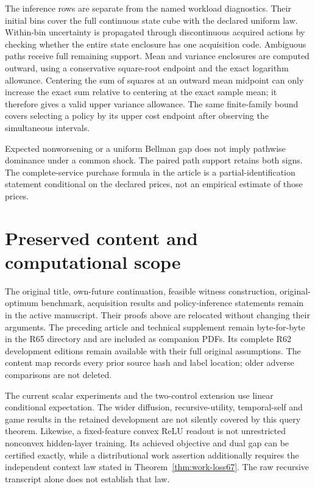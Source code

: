 The inference rows are separate from the named workload diagnostics. Their initial bins cover the full continuous state cube with the declared uniform law. Within-bin uncertainty is propagated through discontinuous acquired actions by checking whether the entire state enclosure has one acquisition code. Ambiguous paths receive full remaining support. Mean and variance enclosures are computed outward, using a conservative square-root endpoint and the exact logarithm allowance. Centering the sum of squares at an outward mean midpoint can only increase the exact sum relative to centering at the exact sample mean; it therefore gives a valid upper variance allowance. The same finite-family bound covers selecting a policy by its upper cost endpoint after observing the simultaneous intervals.

Expected nonworsening or a uniform Bellman gap does not imply pathwise dominance under a common shock. The paired path support retains both signs. The complete-service purchase formula in the article is a partial-identification statement conditional on the declared prices, not an empirical estimate of those prices.

\section{Preserved content and computational scope}\label{supp:preservation67}
The original title, own-future continuation, feasible witness construction, original-optimum benchmark, acquisition results and policy-inference statements remain in the active manuscript. Their proofs above are relocated without changing their arguments. The preceding article and technical supplement remain byte-for-byte in the R65 directory and are included as companion PDFs. Its complete R62 development editions remain available with their full original assumptions. The content map records every prior source hash and label location; older adverse comparisons are not deleted.

The current scalar experiments and the two-control extension use linear conditional expectation. The wider diffusion, recursive-utility, temporal-self and game results in the retained development are not silently covered by this query theorem. Likewise, a fixed-feature convex ReLU readout is not unrestricted nonconvex hidden-layer training. Its achieved objective and dual gap can be certified exactly, while a distributional work assertion additionally requires the independent context law stated in Theorem~\ref{thm:work-loss67}. The raw recursive transcript alone does not establish that law.
